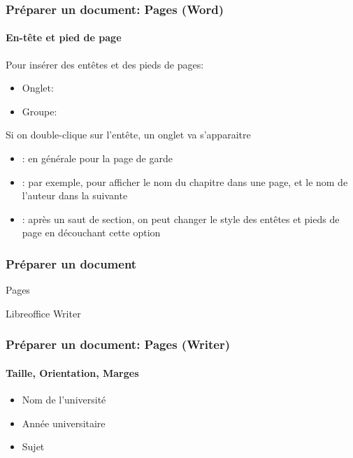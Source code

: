 \documentclass[xcolor=table]{beamer}
\begin{document}
\begin{frame}
\frametitle{Préparer un document: Pages (Word)}
\framesubtitle{En-tête et pied de page}

\begin{minipage}{0.78\textwidth}
	Pour insérer des entêtes et des pieds de pages:
	\begin{itemize}
		\item Onglet:  
		\item Groupe: 
	\end{itemize}
\end{minipage}
\begin{minipage}{0.2\textwidth}
\end{minipage}

\vspace{6pt}
Si on double-clique sur l'entête, un onglet va s'apparaitre
\begin{itemize}
	\item {}: en générale pour la page de garde 
	\item {}: par exemple, pour afficher le nom du chapitre dans une page, et le nom de l'auteur dans la suivante
	\item {}: après un saut de section, on peut changer le style des entêtes et pieds de page en découchant cette option
\end{itemize}


\end{frame}

\begin{frame}
\frametitle{Préparer un document}

\begin{center}
	Pages 
	
	Libreoffice Writer
\end{center}

\end{frame}

\begin{frame}[t]
\frametitle{Préparer un document: Pages (Writer)}
\framesubtitle{Taille, Orientation, Marges}

\begin{minipage}{0.38\textwidth}
	\begin{itemize}
		\item Nom de l'université 
		\item Année universitaire
		\item Sujet
	\end{itemize}
\end{minipage}
\begin{minipage}{0.6\textwidth}
\end{minipage}

\end{frame}
\end{document}
